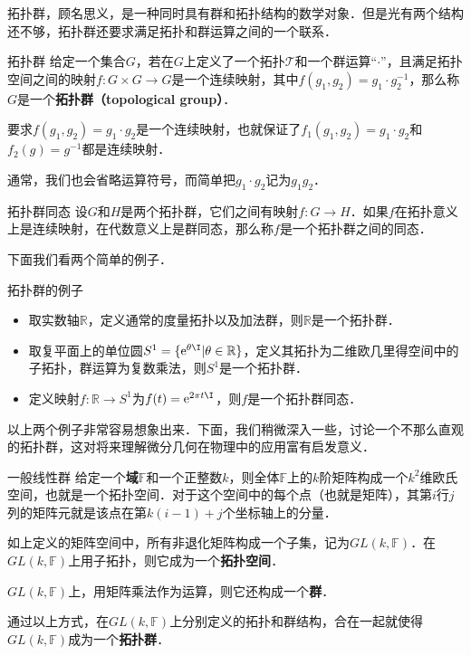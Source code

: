 

拓扑群，顾名思义，是一种同时具有群和拓扑结构的数学对象．但是光有两个结构还不够，拓扑群还要求满足拓扑和群运算之间的一个联系．

\begin{definition}{拓扑群}
给定一个集合$G$，若在$G$上定义了一个拓扑$\mathcal{T}$和一个群运算“$\cdot$”，且满足拓扑空间之间的映射$f:G\times G\rightarrow G$是一个连续映射，其中$f(g_1, g_2)=g_1\cdot g_2^{-1}$，那么称$G$是一个\textbf{拓扑群（topological group）}．
\end{definition}

要求$f(g_1, g_2)=g_1\cdot g_2$是一个连续映射，也就保证了$f_1(g_1, g_2)=g_1\cdot g_2$和$f_2(g)=g^{-1}$都是连续映射．

通常，我们也会省略运算符号，而简单把$g_1\cdot g_2$记为$g_1g_2$．

\begin{definition}{拓扑群同态}
设$G$和$H$是两个拓扑群，它们之间有映射$f:G\rightarrow H$．如果$f$在拓扑意义上是连续映射，在代数意义上是群同态，那么称$f$是一个拓扑群之间的同态．
\end{definition}

下面我们看两个简单的例子．

\begin{example}{拓扑群的例子}
\begin{itemize}
\item 取实数轴$\mathbb{R}$，定义通常的度量拓扑以及加法群，则$\mathbb{R}$是一个拓扑群．
\item 取复平面上的单位圆$S^1=\{\mathrm{e}^{\theta\I}|\theta\in\mathbb{R}\}$，定义其拓扑为二维欧几里得空间中的子拓扑，群运算为复数乘法，则$S^1$是一个拓扑群．
\item 定义映射$f:\mathbb{R}\rightarrow S^1$为$f(t)=\mathrm{e}^{2\pi t\I}$，则$f$是一个拓扑群同态．
\end{itemize}
\end{example}

以上两个例子非常容易想象出来．下面，我们稍微深入一些，讨论一个不那么直观的拓扑群，这对将来理解微分几何在物理中的应用富有启发意义．

\begin{example}{一般线性群}
给定一个\textbf{域}$\mathbb{F}$和一个正整数$k$，则全体$\mathbb{F}$上的$k$阶矩阵构成一个$k^2$维欧氏空间，也就是一个拓扑空间．对于这个空间中的每个点（也就是矩阵），其第$i$行$j$列的矩阵元就是该点在第$k(i-1)+j$个坐标轴上的分量．

如上定义的矩阵空间中，所有非退化矩阵构成一个子集，记为$GL(k, \mathbb{F})$．在$GL(k,\mathbb{F})$上用子拓扑，则它成为一个\textbf{拓扑空间}．

$GL(k,\mathbb{F})$上，用矩阵乘法作为运算，则它还构成一个\textbf{群}．

通过以上方式，在$GL(k, \mathbb{F})$上分别定义的拓扑和群结构，合在一起就使得$GL(k, \mathbb{F})$成为一个\textbf{拓扑群}．
\end{example}

